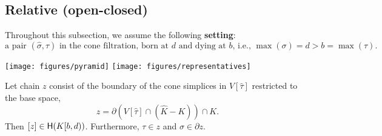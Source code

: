 \documentclass[cleveref,a4paper,english,nolineno]{socg-lipics-v2021}
\newcommand{\Hgr}{{\sf H}}
\newcommand{\cone}[1]{\hat{#1}}
\newcommand{\bdry}{\partial}
\newcommand{\cK}{\cone{K}}
\newcommand{\ssx}{\sigma}
\newcommand{\tsx}{\tau}
\newcommand{\cssx}{\cone{\ssx}}
\newcommand{\ctsx}{\cone{\tsx}}
\begin{document}
\subsection{Relative (open-closed)}
\label{sec:relative}

Throughout this subsection, we assume the following \textbf{setting}:
\[
    \text{a pair $(\cssx,\ctsx)$ in the cone filtration, born at $d$ and dying at $b$,
    i.e., $\max(\ssx) = d > b = \max(\tsx)$.}
\]

    \texttt{[image: figures/pyramid]}
        \quad
    \texttt{[image: figures/representatives]}


    \begin{claim}
        \label{clm:relative-structure}
        Let chain $z$ consist of the
        boundary of the cone simplices in $V[\ctsx]$ restricted to the base
        space,
        \[
            z = \bdry \left(V[\ctsx] \cap (\cK - K) \right) \cap K.
        \]
        Then $[z] \in \Hgr(K[b,d))$.
        Furthermore, $\tsx \in z$ and $\ssx \in \bdry z$.
    \end{claim}
\end{document}
